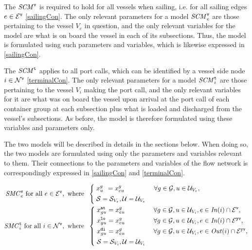 The $\mathit{SCM}^\texttt{v}$ is required to hold for all vessels when sailing, i.e. for all sailing edges $e\in\mathcal{E}^\texttt{v}$ \eqref{sailingCon}. The only relevant parameters for a model $\mathit{SCM}^\texttt{v}_e$ are those pertaining to the vessel $V_e$ in question, and the only relevant variables for the model are what is on board the vessel in each of its subsections. Thus, the model is formulated using such parameters and variables, which is likewise expressed in \eqref{sailingCon}. 

The $\mathit{SCM}^\texttt{t}$ applies to all port calls, which can be identified by a vessel side node $i\in \mathcal{N}^\texttt{v}$ \eqref{terminalCon}. The only relevant parameters for a model $\mathit{SCM}^\texttt{t}_i$ are those pertaining to the vessel $V_i$ making the port call, and the only relevant variables for it are what was on board the vessel upon arrival at the port call of each container group at each subsection plus what is loaded and discharged from the vessel's subsections. As before, the model is therefore formulated using these variables and parameters only.    

The two models will be described in details in the sections below. When doing so, the two models are formulated using only the parameters and variables relevant to them. Their connections to the parameters and variables of the flow network is correspondingly expressed in \eqref{sailingCon} and \eqref{terminalCon}.

\begin{alignat}{3}
\label{sailingCon}
\mi{SMC}^\ttt{v}_e \text{ for all } e\in \mc{E}^\ttt{v}, \text{ where }\;
			&\left\{\;
			\begin{aligned}
					&x^g_{u\phantom{g}} = x^g_{eu} & \;\forall g\in\mc{G}, u\in \mc{U}_{V_e},\\
					&\mc{S} = \mc{S}_{V_e}, \mc{U} = \mc{U}_{V_e} 
			\end{aligned}\right.\\
%
\label{terminalCon}
\mi{SMC}^\ttt{t}_i \text{ for all } i\in\mc{N}^\ttt{v}, \text{ where } \;
			&\left\{\;
			\begin{aligned}
					&x^\ttt{at}_{gu} = x^g_{eu} && \;\forall g\in\mc{G}, u\in \mc{U}_{V_i}, e\in \mi{In}(i)\cap\mc{E}^\ttt{v},\\
					&x^\ttt{lo}_{gu} = x^g_{eu} && \;\forall g\in\mc{G}, u\in \mc{U}_{V_i}, e\in \mi{In}(i)\cap\mc{E}^\ttt{yv},\\
					&x^\ttt{di}_{gu} = x^g_{eu} && \;\forall g\in\mc{G}, u\in \mc{U}_{V_i}, e\in \mi{Out}(i)\cap\mc{E}^\ttt{yv},\\
					&\mc{S} = \mc{S}_{V_i}, \mc{U} = \mc{U}_{V_i} 
			\end{aligned}\right.
\end{alignat}

